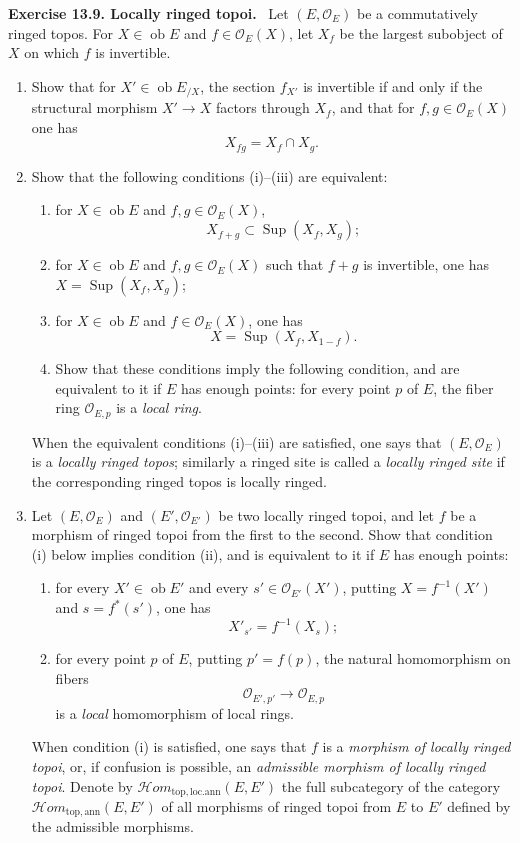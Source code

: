 \documentclass[11pt]{article}
\newcommand{\Oo}{\mathcal{O}}
\newcommand{\ob}{\operatorname{ob}}
\newcommand{\Sup}{\operatorname{Sup}}
\newcommand{\Hhomtopan}{\mathcal{H}om_{\mathrm{top,ann}}}
\newcommand{\Hhomtoplocan}{\mathcal{H}om_{\mathrm{top,loc.ann}}}
\newenvironment{remarktext}[1]{\par\medskip\noindent\textbf{#1.}\ }{\par\medskip}
\begin{document}
\begin{remarktext}{Exercise 13.9. Locally ringed topoi}
Let $(E,\Oo_E)$ be a commutatively ringed topos. For $X\in\ob E$ and $f\in\Oo_E(X)$, let $X_f$ be the largest subobject of $X$ on which $f$ is invertible.
\begin{enumerate}[label=\alph*)]
\item Show that for $X'\in\ob E_{/X}$, the section $f_{X'}$ is invertible if and only if the structural morphism $X'\to X$ factors through $X_f$, and that for $f,g\in\Oo_E(X)$ one has
\[
X_{fg}=X_f\cap X_g.
\]
\item Show that the following conditions (i)--(iii) are equivalent:
\begin{enumerate}[label=(\roman*)]
\item for $X\in\ob E$ and $f,g\in\Oo_E(X)$,
\[
X_{f+g}\subset \Sup(X_f,X_g);
\]
\item for $X\in\ob E$ and $f,g\in\Oo_E(X)$ such that $f+g$ is invertible, one has $X=\Sup(X_f,X_g)$;
\item for $X\in\ob E$ and $f\in\Oo_E(X)$, one has
\[
X=\Sup(X_f,X_{1-f}).
\]
\item Show that these conditions imply the following condition, and are equivalent to it if $E$ has enough points: for every point $p$ of $E$, the fiber ring $\Oo_{E,p}$ is a \emph{local ring}.
\end{enumerate}
When the equivalent conditions (i)--(iii) are satisfied, one says that $(E,\Oo_E)$ is a \emph{locally ringed topos}; similarly a ringed site is called a \emph{locally ringed site} if the corresponding ringed topos is locally ringed.
\item Let $(E,\Oo_E)$ and $(E',\Oo_{E'})$ be two locally ringed topoi, and let $f$ be a morphism of ringed topoi from the first to the second. Show that condition (i) below implies condition (ii), and is equivalent to it if $E$ has enough points:
\begin{enumerate}[label=(\roman*)]
\item for every $X'\in\ob E'$ and every $s'\in\Oo_{E'}(X')$, putting $X=f^{-1}(X')$ and $s=f^*(s')$, one has
\[
X'_{s'}=f^{-1}(X_s);
\]
\item for every point $p$ of $E$, putting $p'=f(p)$, the natural homomorphism on fibers
\[
\Oo_{E',p'}\longrightarrow \Oo_{E,p}
\]
is a \emph{local} homomorphism of local rings.
\end{enumerate}
When condition (i) is satisfied, one says that $f$ is a \emph{morphism of locally ringed topoi}, or, if confusion is possible, an \emph{admissible morphism of locally ringed topoi}. Denote by $\Hhomtoplocan(E,E')$ the full subcategory of the category $\Hhomtopan(E,E')$ of all morphisms of ringed topoi from $E$ to $E'$ defined by the admissible morphisms.

\end{enumerate}
\end{remarktext}
\end{document}
